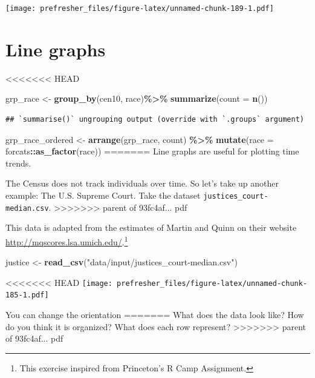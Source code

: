 \documentclass[]{book}
\newenvironment{Shaded}{\begin{snugshade}}{\end{snugshade}}
\newcommand{\DataTypeTok}[1]{\textcolor[rgb]{0.13,0.29,0.53}{#1}}
\newcommand{\KeywordTok}[1]{\textcolor[rgb]{0.13,0.29,0.53}{\textbf{#1}}}
\newcommand{\NormalTok}[1]{#1}
\newcommand{\OperatorTok}[1]{\textcolor[rgb]{0.81,0.36,0.00}{\textbf{#1}}}
\newcommand{\StringTok}[1]{\textcolor[rgb]{0.31,0.60,0.02}{#1}}
\let\rmarkdownfootnote\footnote%
\def\footnote{\protect\rmarkdownfootnote}
\theoremstyle{definition}
\theoremstyle{definition}
\theoremstyle{definition}
\theoremstyle{remark}
\begin{document}
\begin{Shaded}
\begin{Highlighting}[]
\begin{Shaded}
\begin{Highlighting}[]
\texttt{[image: prefresher\_files/figure-latex/unnamed-chunk-189-1.pdf]}

\hypertarget{line-graphs}{%
\section{Line graphs}\label{line-graphs}}

<<<<<<< HEAD
\begin{Shaded}
\begin{Highlighting}[]
\NormalTok{grp\_race <{-}}\StringTok{ }\KeywordTok{group\_by}\NormalTok{(cen10, race)}\OperatorTok{\%>\%}
\StringTok{  }\KeywordTok{summarize}\NormalTok{(}\DataTypeTok{count =} \KeywordTok{n}\NormalTok{())}
\end{Highlighting}
\end{Shaded}

\begin{verbatim}
## `summarise()` ungrouping output (override with `.groups` argument)
\end{verbatim}

\begin{Shaded}
\begin{Highlighting}[]
\NormalTok{grp\_race\_ordered <{-}}\StringTok{ }\KeywordTok{arrange}\NormalTok{(grp\_race, count) }\OperatorTok{\%>\%}\StringTok{ }
\StringTok{  }\KeywordTok{mutate}\NormalTok{(}\DataTypeTok{race =}\NormalTok{ forcats}\OperatorTok{::}\KeywordTok{as\_factor}\NormalTok{(race))}
=======
Line graphs are useful for plotting time trends.

The Census does not track individuals over time. So let's take up another example: The U.S. Supreme Court. Take the dataset \texttt{justices\_court-median.csv}.
>>>>>>> parent of 93fc4af... pdf

This data is adapted from the estimates of Martin and Quinn on their website \url{http://mqscores.lsa.umich.edu/}.\footnote{This exercise inspired from Princeton's R Camp Assignment.}

\begin{Shaded}
\begin{Highlighting}[]
\NormalTok{justice <-}\StringTok{ }\KeywordTok{read_csv}\NormalTok{(}\StringTok{"data/input/justices_court-median.csv"}\NormalTok{)}
\end{Highlighting}
\end{Shaded}

<<<<<<< HEAD
\texttt{[image: prefresher\_files/figure-latex/unnamed-chunk-185-1.pdf]}

You can change the orientation
=======
What does the data look like? How do you think it is organized? What does each row represent?
>>>>>>> parent of 93fc4af... pdf


\end{Highlighting}
\end{Shaded}
\end{Highlighting}
\end{Shaded}
\end{Highlighting}
\end{Shaded}
\end{document}
